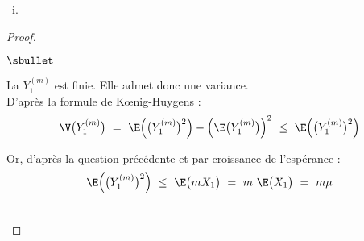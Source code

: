 \documentclass[11pt]{article}%
\begin{document}
\begin{liste}{\ i.}
\begin{proof}
\begin{noliste}{$\sbullet$}
    \item La \var $Y_{1}^{(m)}$ est finie. Elle admet donc une
      variance.\\
      D'après la formule de K\oe{}nig-Huygens :
      \[
      \V\big( Y_{1}^{(m)} \big) \ = \ \E\Big(\big( Y_{1}^{(m)} \big)^2
      \Big) - \Big(\E\big( Y_{1}^{(m)} \big) \Big)^2 \ \leq \
      \E\Big(\big( Y_{1}^{(m)} \big)^2 \Big)
      \]
      
    \item Or, d'après la question précédente et par croissance de
      l'espérance : 
      \[
      \E\Big(\big( Y_{1}^{(m)} \big)^2 \Big) \ \leq \ \E\big(m
      X_1\big) \ = \ m \ \E\big(X_1\big) \ = \ m \mu
      \]        
    \end{noliste}
    ~\\[-1cm]
  \end{proof}
\end{liste}
\end{document}

